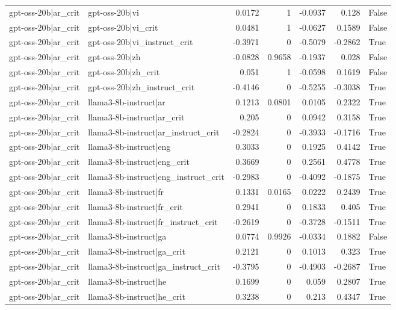 \begin{table}
\begin{tabular}{l l r r r r l}
gpt-oss-20b|ar_crit & gpt-oss-20b|vi & 0.0172 & 1 & -0.0937 & 0.128 & False \\
gpt-oss-20b|ar_crit & gpt-oss-20b|vi_crit & 0.0481 & 1 & -0.0627 & 0.1589 & False \\
gpt-oss-20b|ar_crit & gpt-oss-20b|vi_instruct_crit & -0.3971 & 0 & -0.5079 & -0.2862 & True \\
gpt-oss-20b|ar_crit & gpt-oss-20b|zh & -0.0828 & 0.9658 & -0.1937 & 0.028 & False \\
gpt-oss-20b|ar_crit & gpt-oss-20b|zh_crit & 0.051 & 1 & -0.0598 & 0.1619 & False \\
gpt-oss-20b|ar_crit & gpt-oss-20b|zh_instruct_crit & -0.4146 & 0 & -0.5255 & -0.3038 & True \\
gpt-oss-20b|ar_crit & llama3-8b-instruct|ar & 0.1213 & 0.0801 & 0.0105 & 0.2322 & True \\
gpt-oss-20b|ar_crit & llama3-8b-instruct|ar_crit & 0.205 & 0 & 0.0942 & 0.3158 & True \\
gpt-oss-20b|ar_crit & llama3-8b-instruct|ar_instruct_crit & -0.2824 & 0 & -0.3933 & -0.1716 & True \\
gpt-oss-20b|ar_crit & llama3-8b-instruct|eng & 0.3033 & 0 & 0.1925 & 0.4142 & True \\
gpt-oss-20b|ar_crit & llama3-8b-instruct|eng_crit & 0.3669 & 0 & 0.2561 & 0.4778 & True \\
gpt-oss-20b|ar_crit & llama3-8b-instruct|eng_instruct_crit & -0.2983 & 0 & -0.4092 & -0.1875 & True \\
gpt-oss-20b|ar_crit & llama3-8b-instruct|fr & 0.1331 & 0.0165 & 0.0222 & 0.2439 & True \\
gpt-oss-20b|ar_crit & llama3-8b-instruct|fr_crit & 0.2941 & 0 & 0.1833 & 0.405 & True \\
gpt-oss-20b|ar_crit & llama3-8b-instruct|fr_instruct_crit & -0.2619 & 0 & -0.3728 & -0.1511 & True \\
gpt-oss-20b|ar_crit & llama3-8b-instruct|ga & 0.0774 & 0.9926 & -0.0334 & 0.1882 & False \\
gpt-oss-20b|ar_crit & llama3-8b-instruct|ga_crit & 0.2121 & 0 & 0.1013 & 0.323 & True \\
gpt-oss-20b|ar_crit & llama3-8b-instruct|ga_instruct_crit & -0.3795 & 0 & -0.4903 & -0.2687 & True \\
gpt-oss-20b|ar_crit & llama3-8b-instruct|he & 0.1699 & 0 & 0.059 & 0.2807 & True \\
gpt-oss-20b|ar_crit & llama3-8b-instruct|he_crit & 0.3238 & 0 & 0.213 & 0.4347 & True \\

\end{tabular}
\end{table}
